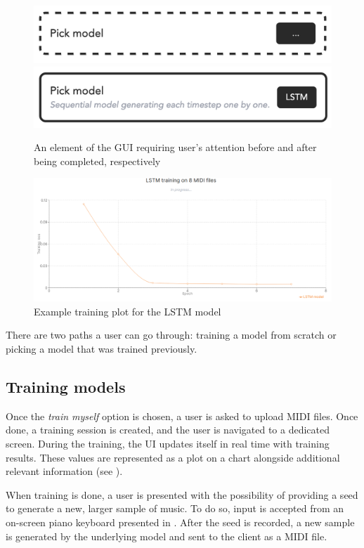\documentclass[a4paper, 11pt, twoside]{report}
\theoremstyle{definition}
\begin{document}
\begin{figure}[t]
    \centering
    \includegraphics[width=0.6\linewidth]{gui_action_todo.png}
    \includegraphics[width=0.6\linewidth]{gui_action_done.png}
    \caption{An element of the GUI requiring user's attention before and after being completed, respectively}
    \label{fig:gui_action}
\end{figure}

\begin{figure}[t]
    \centering
    \includegraphics[width=0.98\linewidth]{gui_training_chart.png}
    \caption{Example training plot for the LSTM model}
    \label{fig:gui_chart}
\end{figure}

There are two paths a user can go through: training a model from scratch or picking a model that was trained previously. \par

\subsection{Training models}

Once the \textit{train myself} option is chosen, a user is asked to upload MIDI files. Once done, a training session is created, and the user is navigated to a dedicated screen. During the training, the UI updates itself in real time with training results. These values are represented as a plot on a chart alongside additional relevant information (see ). \par
When training is done, a user is presented with the possibility of providing a seed to generate a new, larger sample of music. To do so, input is accepted from an on-screen piano keyboard presented in . After the seed is recorded, a new sample is generated by the underlying model and sent to the client as a MIDI file. \par
\end{document}
